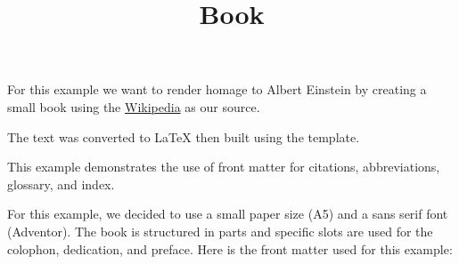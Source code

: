 \documentclass[a4paper,twoside]{article}
\title{Book}
\author{}\date{}
\begin{document}
\maketitle
{}\label{einstein}
For this example we want to render homage to Albert Einstein by creating a small book using the \href{https://en.wikipedia.org/wiki/Albert\_Einstein}{Wikipedia}
as our source.

The text was converted to \LaTeX{} then built using the  template.

This example demonstrates the use of front matter for citations, abbreviations, glossary, and index.

For this example, we decided to use a small paper size (A5) and a sans serif font (Adventor). The book is structured in parts and specific slots are used for the colophon, dedication, and preface. Here is the front matter used for this example:
\end{document}
